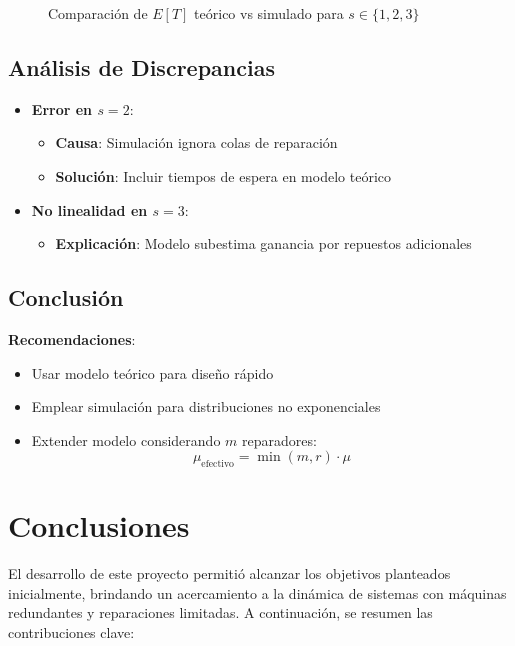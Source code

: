 \documentclass[a4paper, 12pt]{article}
\begin{document}
\begin{figure}[h]
    \centering
    
    \caption{Comparación de \( E[T] \) teórico vs simulado para \( s \in \{1,2,3\} \)}
    \label{fig:comparison}
\end{figure}

\subsection{Análisis de Discrepancias}
\begin{itemize}
    \item \textbf{Error en \( s=2 \)}: 
    \begin{itemize}
        \item \textbf{Causa}: Simulación ignora colas de reparación
        \item \textbf{Solución}: Incluir tiempos de espera en modelo teórico
    \end{itemize}
    
    \item \textbf{No linealidad en \( s=3 \)}: 
    \begin{itemize}
        \item \textbf{Explicación}: Modelo subestima ganancia por repuestos adicionales
    \end{itemize}
\end{itemize}

\subsection{Conclusión}
 \textbf{Recomendaciones}:
    \begin{itemize}
        \item Usar modelo teórico para diseño rápido
        \item Emplear simulación para distribuciones no exponenciales
        \item Extender modelo considerando \( m \) reparadores:
        \begin{equation}
            \mu_{\text{efectivo}} = \min(m, r) \cdot \mu
        \end{equation}
    \end{itemize}


\newpage
\section{Conclusiones}

El desarrollo de este proyecto permitió alcanzar los objetivos planteados inicialmente, brindando un acercamiento a la dinámica de sistemas con máquinas redundantes y reparaciones limitadas. A continuación, se resumen las contribuciones clave:
\end{document}
